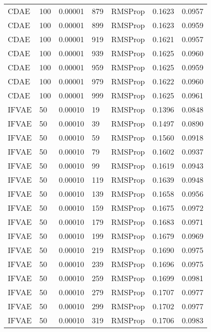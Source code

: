 \begin{tabular}{llrllrr}
    CDAE &  100 &  0.00001 &   879 &   RMSProp &  0.1623 &       0.0957 \\
    CDAE &  100 &  0.00001 &   899 &   RMSProp &  0.1623 &       0.0959 \\
    CDAE &  100 &  0.00001 &   919 &   RMSProp &  0.1621 &       0.0957 \\
    CDAE &  100 &  0.00001 &   939 &   RMSProp &  0.1625 &       0.0960 \\
    CDAE &  100 &  0.00001 &   959 &   RMSProp &  0.1625 &       0.0959 \\
    CDAE &  100 &  0.00001 &   979 &   RMSProp &  0.1622 &       0.0960 \\
    CDAE &  100 &  0.00001 &   999 &   RMSProp &  0.1625 &       0.0961 \\
   IFVAE &   50 &  0.00010 &    19 &   RMSProp &  0.1396 &       0.0848 \\
   IFVAE &   50 &  0.00010 &    39 &   RMSProp &  0.1497 &       0.0890 \\
   IFVAE &   50 &  0.00010 &    59 &   RMSProp &  0.1560 &       0.0918 \\
   IFVAE &   50 &  0.00010 &    79 &   RMSProp &  0.1602 &       0.0937 \\
   IFVAE &   50 &  0.00010 &    99 &   RMSProp &  0.1619 &       0.0943 \\
   IFVAE &   50 &  0.00010 &   119 &   RMSProp &  0.1639 &       0.0948 \\
   IFVAE &   50 &  0.00010 &   139 &   RMSProp &  0.1658 &       0.0956 \\
   IFVAE &   50 &  0.00010 &   159 &   RMSProp &  0.1675 &       0.0972 \\
   IFVAE &   50 &  0.00010 &   179 &   RMSProp &  0.1683 &       0.0971 \\
   IFVAE &   50 &  0.00010 &   199 &   RMSProp &  0.1679 &       0.0969 \\
   IFVAE &   50 &  0.00010 &   219 &   RMSProp &  0.1690 &       0.0975 \\
   IFVAE &   50 &  0.00010 &   239 &   RMSProp &  0.1696 &       0.0975 \\
   IFVAE &   50 &  0.00010 &   259 &   RMSProp &  0.1699 &       0.0981 \\
   IFVAE &   50 &  0.00010 &   279 &   RMSProp &  0.1707 &       0.0977 \\
   IFVAE &   50 &  0.00010 &   299 &   RMSProp &  0.1702 &       0.0977 \\
   IFVAE &   50 &  0.00010 &   319 &   RMSProp &  0.1706 &       0.0983 \\

\end{tabular}
